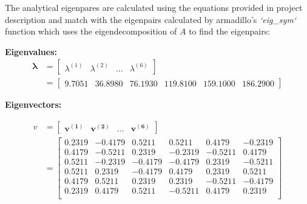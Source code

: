 \documentclass[final, 3p, times, 11.5pt]{article}
\begin{document}
The analytical eigenpares are calculated using the equations provided in project description and match with the eigenpairs calculated by armadillo's \textit{`eig\_sym`} function which uses the eigendecomposition of $A$ to find the eigenpairs: 

\textbf{Eigenvalues:}
    \begin{align*}
    \mathbf{\lambda} &= \begin{bmatrix} \lambda^{(1)} & \lambda^{(2)} & \dots & \lambda^{(6)}\end{bmatrix}        \\
    &= \begin{bmatrix} 
    9.7051 & 36.8980 & 76.1930 & 119.8100 & 159.1000 & 186.2900
    \end{bmatrix}
    \end{align*}

\textbf{Eigenvectors:}

    \begin{align*}
        v &= \begin{bmatrix}\mathbf{v^{(1)}} & \mathbf{v^{(2)}} & \dots & \mathbf{v^{(6)}}\end{bmatrix} \\
        & = \begin{bmatrix}
            0.2319 & -0.4179 & 0.5211 & 0.5211 & 0.4179 & -0.2319 \\
0.4179 & -0.5211 & 0.2319 & -0.2319 & -0.5211 & 0.4179 \\
0.5211 & -0.2319 & -0.4179 & -0.4179 & 0.2319 & -0.5211 \\
0.5211 & 0.2319 & -0.4179 & 0.4179 & 0.2319 & 0.5211 \\
0.4179 & 0.5211 & 0.2319 & 0.2319 & -0.5211 & -0.4179 \\
0.2319 & 0.4179 & 0.5211 & -0.5211 & 0.4179 & 0.2319 \\
        \end{bmatrix}
    \end{align*}
\end{document}
